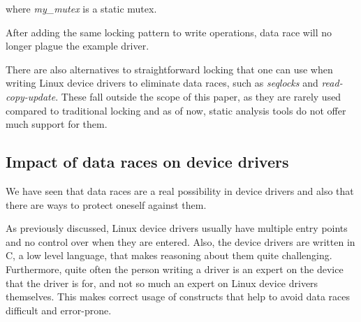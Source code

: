 \documentclass[..thesis.tex]{subfiles}
\begin{document}
where \textit{my\_mutex} is a static mutex.

After adding the same locking pattern to write operations, data race will no longer plague the example driver.




There are also alternatives to straightforward locking that one can use when writing Linux device drivers to eliminate data races, such as \textit{seqlocks} and \textit{read-copy-update}. These fall outside the scope of this paper, as they are rarely used compared to traditional locking and as of now, static analysis tools do not offer much support for them. 


\subsection{Impact of data races on device drivers}

We have seen that data races are a real possibility in device drivers and also that there are ways to protect oneself against them. 


As previously discussed, Linux device drivers usually have multiple entry points and no control over when they are entered. Also, the device drivers are written in C, a low level language, that makes reasoning about them quite challenging. Furthermore, quite often the person writing a driver is an expert on the device that the driver is for, and not so much an expert on Linux device drivers themselves. This makes correct usage of constructs that help to avoid data races difficult and error-prone.



\end{document}
